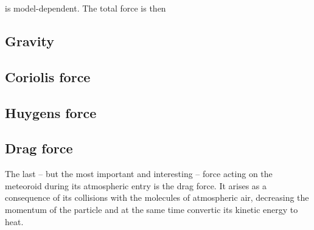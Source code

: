 %



    is model-dependent. The total force is then

    \subsection{Gravity} \label{dfg}
        

    \subsection{Coriolis force} \label{dfC}


    \subsection{Huygens force} \label{dfH}


    \subsection{Drag force} \label{dfd}
        The last -- but the most important and interesting -- force acting on the meteoroid during
        its atmospheric entry is the drag force. It arises as a consequence of its collisions with
        the molecules of atmospheric air, decreasing the momentum of the particle and at the
        same time convertic its kinetic energy to heat.

